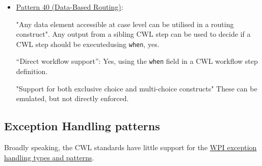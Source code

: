 \begin{itemize}
\item \href{http://www.workflowpatterns.com/patterns/data/routing/wdp40.php}{Pattern 40 (Data-Based Routing)}:

"Any data element accessible at case level can be utilised in a routing construct". Any output from a sibling CWL step can be used to decide if a CWL step should be executedusing \verb|when|, yes.

“Direct workflow support”: Yes, using the \verb|when| field in a CWL workflow step definition.

"Support for both exclusive choice and multi-choice constructs" These can be emulated, but not directly enforced.
\end{itemize}

\subsection{Exception Handling patterns}

Broadly speaking, the CWL standards have little support for the \href{http://www.workflowpatterns.com/patterns/exception/}{WPI exception handling types and patterns}\cite{russell_exception_2006}.

